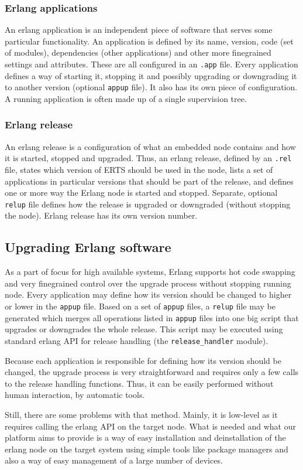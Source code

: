 \subsubsection{Erlang applications}

An erlang application is an independent piece of software that serves some particular
functionality. An application is defined by its name, version, code (set of modules),
dependencies (other applications) and other more finegrained settings and attributes. These are all
configured in an {\tt .app} file. Every application defines a way of starting it, stopping it and possibly
upgrading or downgrading it to another version (optional {\tt appup} file). It also has its own piece of configuration.
A running application is often made up of a single supervision tree.

\subsubsection{Erlang release}

An erlang release is a configuration of what an embedded node contains and how it is
started, stopped and upgraded. Thus, an erlang release, defined by an {\tt .rel} file,
states which version of ERTS should be used in the node, lists a set of applications in 
particular versions that should be part of the release, and defines one or more way the
Erlang node is started and stopped. Separate, optional {\tt relup} file defines how the
release is upgraded or downgraded (without stopping the node).
Erlang release has its own version number.

\subsection{Upgrading Erlang software}

As a part of focus for high available systems, Erlang supports hot code swapping and
very finegrained control over the upgrade process without stopping running node.
Every application may define how its version should be changed to higher or lower in the
{\tt appup} file. Based on a set of {\tt appup} files, a {\tt relup} file may be generated
which merges all operations listed in {\tt appup} files into one big script that
upgrades or downgrades the whole release. This script may be executed using standard erlang
API for release handling (the {\tt release\_handler} module).

Because each application is responsible
for defining how its version should be changed, the upgrade process is very straightforward
and requires only a few calls to the release handling functions. Thus, it can be easily
performed without human interaction, by automatic tools.

Still, there are some problems with that method. Mainly, it is low-level as it requires
calling the erlang API on the target node. What is needed and what our platform aims to provide is
a way of easy installation and deinstallation of the erlang node on the target system using
simple tools like package managers and also a way of easy management of a large number of devices.

